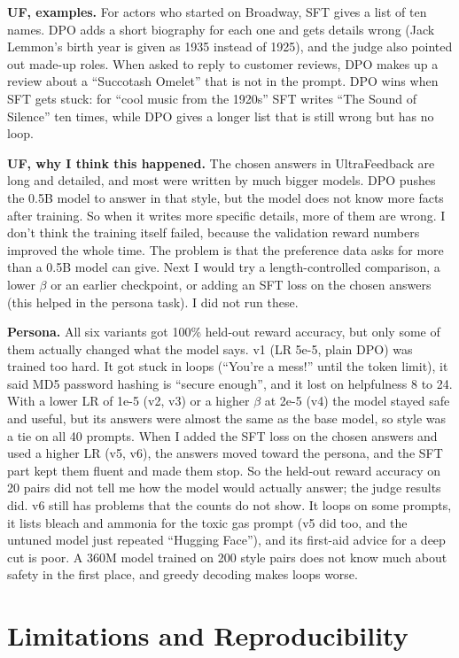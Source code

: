 \documentclass[10pt,a4paper]{article}
\begin{document}
\textbf{UF, examples.} For actors who started on Broadway, SFT gives a list of ten names. DPO adds a short biography
for each one and gets details wrong (Jack Lemmon's birth year is given as 1935 instead of 1925), and the judge also
pointed out made-up roles. When asked to reply to customer reviews, DPO makes up a review about a ``Succotash Omelet''
that is not in the prompt. DPO wins when SFT gets stuck: for ``cool music from the 1920s'' SFT writes ``The Sound of
Silence'' ten times, while DPO gives a longer list that is still wrong but has no loop.

\textbf{UF, why I think this happened.} The chosen answers in UltraFeedback are long and detailed, and most were
written by much bigger models. DPO pushes the 0.5B model to answer in that style, but the model does not know more
facts after training. So when it writes more specific details, more of them are wrong. I don't think the training
itself failed, because the validation reward numbers improved the whole time. The problem is that the preference data
asks for more than a 0.5B model can give. Next I would try a length-controlled comparison, a lower $\beta$ or an earlier
checkpoint, or adding an SFT loss on the chosen answers (this helped in the persona task). I did not run these.

\textbf{Persona.} All six variants got 100\% held-out reward accuracy, but only some of them actually changed what the
model says. v1 (LR 5e-5, plain DPO) was trained too hard. It got stuck in loops (``You're a mess!'' until the token
limit), it said MD5 password hashing is ``secure enough'', and it lost on helpfulness 8 to 24. With a lower LR of 1e-5
(v2, v3) or a higher $\beta$ at 2e-5 (v4) the model stayed safe and useful, but its answers were almost the same as the
base model, so style was a tie on all 40 prompts. When I added the SFT loss on the chosen answers and used a higher LR
(v5, v6), the answers moved toward the persona, and the SFT part kept them fluent and made them stop. So the held-out
reward accuracy on 20 pairs did not tell me how the model would actually answer; the judge results did. v6 still has
problems that the counts do not show. It loops on some prompts, it lists bleach and ammonia for the toxic gas prompt (v5
did too, and the untuned model just repeated ``Hugging Face''), and its first-aid advice for a deep cut is poor. A 360M
model trained on 200 style pairs does not know much about safety in the first place, and greedy decoding makes loops
worse.

\section{Limitations and Reproducibility}
\end{document}
